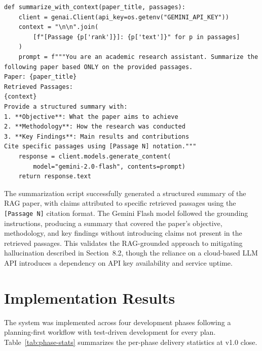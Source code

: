 \documentclass[12pt,a4paper]{article}
\begin{document}
\begin{lstlisting}[caption={RAG-grounded summarization with Gemini Flash},label=lst:summarization]
def summarize_with_context(paper_title, passages):
    client = genai.Client(api_key=os.getenv("GEMINI_API_KEY"))
    context = "\n\n".join(
        [f"[Passage {p['rank']}]: {p['text']}" for p in passages]
    )
    prompt = f"""You are an academic research assistant. Summarize the
following paper based ONLY on the provided passages.
Paper: {paper_title}
Retrieved Passages:
{context}
Provide a structured summary with:
1. **Objective**: What the paper aims to achieve
2. **Methodology**: How the research was conducted
3. **Key Findings**: Main results and contributions
Cite specific passages using [Passage N] notation."""
    response = client.models.generate_content(
        model="gemini-2.0-flash", contents=prompt)
    return response.text
\end{lstlisting}

The summarization script successfully generated a structured summary of the RAG paper, with claims attributed to specific retrieved passages using the \texttt{[Passage N]} citation format. The Gemini Flash model followed the grounding instructions, producing a summary that covered the paper's objective, methodology, and key findings without introducing claims not present in the retrieved passages. This validates the RAG-grounded approach to mitigating hallucination described in Section~8.2, though the reliance on a cloud-based LLM API introduces a dependency on API key availability and service uptime.

\section{Implementation Results}

The system was implemented across four development phases following a planning-first
workflow with test-driven development for every plan. Table~\ref{tab:phase-stats}
summarizes the per-phase delivery statistics at v1.0 close.
\end{document}
